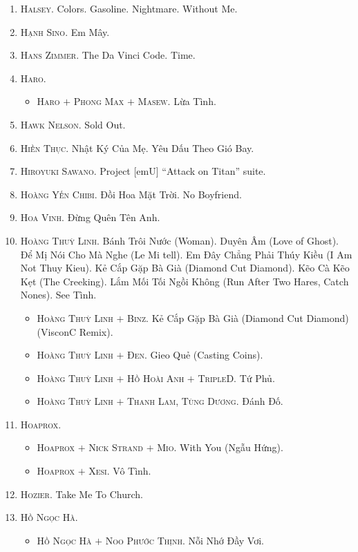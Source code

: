 \documentclass{article}
\numberwithin{equation}{section}
\begin{document}
\begin{enumerate}
	\item \textsc{Halsey.} Colors. Gasoline. Nightmare. Without Me.
	\item \textsc{Hạnh Sino.} Em Mây.
	\item \textsc{Hans Zimmer.} The Da Vinci Code. Time.
	\item \textsc{Haro.}
	\begin{itemize}
		\item \textsc{Haro $+$ Phong Max $+$ Masew.} Lừa Tình.
	\end{itemize}
	\item \textsc{Hawk Nelson.} Sold Out.
	\item \textsc{Hiền Thục.} Nhật Ký Của Mẹ. Yêu Dấu Theo Gió Bay.
	\item \textsc{Hiroyuki Sawano.} Project [emU] ``Attack on Titan'' suite.
	\item \textsc{Hoàng Yến Chibi.} Đồi Hoa Mặt Trời. No Boyfriend.
	\item \textsc{Hoa Vinh.} Đừng Quên Tên Anh.
	\item \textsc{Hoàng Thuỳ Linh.} Bánh Trôi Nước (Woman). Duyên Âm (Love of Ghost). Để Mị Nói Cho Mà Nghe (Le Mi tell). Em Đây Chẳng Phải Thúy Kiều (I Am Not Thuy Kieu). Kẻ Cắp Gặp Bà Già (Diamond Cut Diamond). Kẽo Cà Kẽo Kẹt (The Creeking). Lắm Mối Tối Ngồi Không (Run After Two Hares, Catch Nones). See Tình.
	\begin{itemize}
		\item \textsc{Hoàng Thuỳ Linh $+$ Binz.} Kẻ Cắp Gặp Bà Già (Diamond Cut Diamond) (VisconC Remix). 
		\item \textsc{Hoàng Thuỳ Linh $+$ Đen.} Gieo Quẻ (Casting Coins).
		\item \textsc{Hoàng Thuỳ Linh $+$ Hồ Hoài Anh $+$ TripleD.} Tứ Phủ.
		\item \textsc{Hoàng Thuỳ Linh $+$ Thanh Lam, Tùng Dương.} Đánh Đố.
	\end{itemize}
	\item \textsc{Hoaprox.}
	\begin{itemize}
		\item \textsc{Hoaprox $+$ Nick Strand $+$ Mio.} With You (Ngẫu Hứng).
		\item \textsc{Hoaprox $+$ Xesi.} Vô Tình.
	\end{itemize}
	\item \textsc{Hozier.} Take Me To Church.
	\item \textsc{Hồ Ngọc Hà.}
	\begin{itemize}
		\item \textsc{Hồ Ngọc Hà $+$ Noo Phước Thịnh.} Nỗi Nhớ Đầy Vơi.

\end{itemize}
\end{enumerate}
\end{document}
